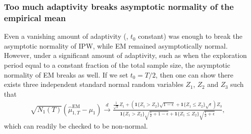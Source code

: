 \subsubsection{Too much adaptivity breaks asymptotic normality of the empirical mean} Even a vanishing amount of adaptivity (\ie, $t_0$ constant) was enough to break the asymptotic normality of IPW, while EM remained asymptotically normal. However, under a significant amount of adaptivity, such as when the exploration period equal to a constant fraction of the total sample size, the asymptotic normality of EM breaks as well.
If we set $t_0=T/2$, then one can show
there exists three independent standard normal random variables $Z_1$, $Z_2$ and $Z_3$ such that
 \begin{align*}
\sqrt{N_1(T)} (\widehat{\mu}_{1,T}^{\mathrm{EM}} - \mu_1) \xrightarrow{d} \frac{ \frac{1}{\sqrt{2}} Z_1 + \left(\bm{1}\{ Z_1 > Z_2\} \sqrt{1-\epsilon} + \bm{1}\{Z_1 \leq Z_2\} \sqrt{\epsilon}\right) Z_3 }{\bm{1}\{ Z_1 > Z_2\} \sqrt{\frac{1}{2} + 1 - \epsilon}  +  \bm{1}\{ Z_1 \leq Z_2\} \sqrt{\frac{1}{2} + \epsilon } },
\end{align*}
which can readily be checked to be non-normal.

